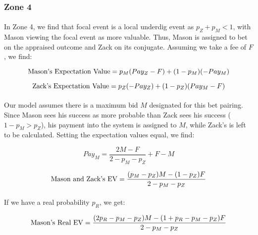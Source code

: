 \documentclass[12pt,letterpaper]{article}
\begin{document}
\subsubsection*{Zone 4}

\paragraph{} In Zone 4, we find that focal event is a local underdig event as $p_Z + p_M < 1$, with Mason viewing the focal event as more valuable. Thus, Mason is assigned to bet on the appraised outcome and Zack on its conjugate. Assuming we take a fee of $F$, we find:

\begin{equation}
\textnormal{Mason's Expectation Value} = p_M (Pay_Z - F) + (1 - p_M )(-Pay_M)
\end{equation}

\begin{equation}
\textnormal{Zack's Expectation Value} = p_Z (-Pay_Z) + (1 - p_Z )(Pay_M - F) 
\end{equation}

\paragraph{} Our model assumes there is a maximum bid $M$ designated for this bet pairing. Since Mason sees his success as more probable than Zack sees his success ($1 - p_M > p_Z$), his payment into the system is assigned to $M$, while Zack’s is left to be calculated. Setting the expectation values equal, we find:

\begin{equation}
Pay_M = \frac{2M - F}{2- p_M - p_Z} + F - M
\end{equation}

\begin{equation}
\textnormal{Mason and Zack's EV} = \frac{(p_M - p_Z)M - (1 - p_Z) F}{2 - p_M - p_Z}
\end{equation}

\paragraph{} If we have a real probability $p_R$, we get:

\begin{equation}
\textnormal{Mason's Real EV} = \frac{(2p_R - p_M - p_Z)M - (1 + p_R - p_M - p_Z)F}{2 - p_M - p_Z}
\end{equation}
\end{document}
